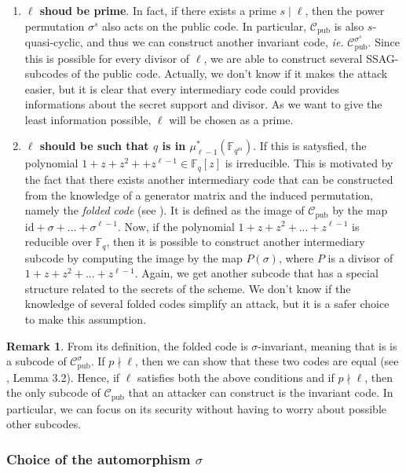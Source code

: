 \documentclass[10pt]{article}
\theoremstyle{definition}
\newtheorem{rq1}[thm]{Remark}
\theoremstyle{definition}
\theoremstyle{definition}
\newcommand{\C}{\mathcal{C}}
\newcommand{\Fqm}{\mathbb{F}_{q^m}}
\newcommand{\Fq}{\mathbb{F}_q}
\begin{document}
\begin{enumerate}
\item \textbf{$\ell$ shoud be prime}. In fact, if there exists a prime $s \mid \ell$, then the power permutation $\sigma^s$ also acts on the public code. In particular, $\C_{\textrm{pub}}$ is also $s$-quasi-cyclic, and thus we can construct another invariant code, \textit{ie.} $\C_{\textrm{pub}}^{\sigma^s}$. Since this is possible for every divisor of $\ell$, we are able to construct several SSAG-subcodes of the public code. Actually, we don't know if it makes the attack easier, but it is clear that every intermediary code could provides informations about the secret support and divisor. As we want to give the least information possible, $\ell$ will be chosen as a prime.

\item \textbf{$\ell$ should be such that $q$ is in $\mu_{\ell -1}^*(\Fqm)$}. If this is satysfied, the polynomial $1+z+z^2++z^{\ell-1} \in \Fq[z]$ is irreducible. This is motivated by the fact that there exists another intermediary code that can be constructed from the knowledge of a generator matrix and the induced permutation, namely the \textit{folded code} (see \cite{FOP}). It is defined as the image of $\C_{\textrm{pub}}$ by the map $\mathrm{id} +\sigma+...+\sigma^{\ell-1}$. Now, if the polynomial $1+z+z^2+...+z^{\ell-1}$ is reducible over $\Fq$, then it is possible to construct another intermediary subcode by computing the image by the map $P(\sigma)$, where $P$ is a divisor of $1+z+z^2+...+z^{\ell-1}$. Again, we get another subcode that has a special structure related to the secrets of the scheme. We don't know if the knowledge of several folded codes simplify an attack, but it is a safer choice to make this assumption.
\end{enumerate}

\begin{rq1} \label{un seul subcode} 
From its definition, the folded code is $\sigma$-invariant, meaning that is is a subcode of $\C_{\mathrm{pub}}^{\sigma}$. If $p \nmid \ell$, then we can show that these two codes are equal (see \cite{Bar1} , Lemma 3.2). Hence, if $\ell$ satisfies both the above conditions and if $p \nmid \ell$, then the only subcode of $\mathcal{C}_{\mathrm{pub}}$ that an attacker can construct is the invariant code. In particular, we can focus on its security without having to worry about possible other subcodes.  
\end{rq1}


\subsubsection{Choice of the automorphism $\sigma$} \label{choice_of_sigma}
\end{document}
